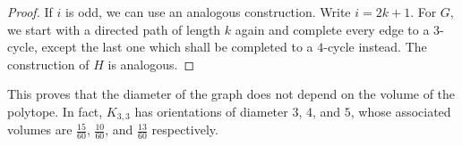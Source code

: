 \documentclass[11pt, twoside]{article}
\numberwithin{equation}{section}
\numberwithin{table}{section}
\numberwithin{figure}{section}
\theoremstyle{definition}
\theoremstyle{definition}
\theoremstyle{definition}
\begin{document}
\begin{appendices}
\begin{proof}
    If $i$ is odd, we can use an analogous construction.
    Write $i=2k+1$.
    For $G$, we start with a directed path of length $k$ again and complete every edge to a $3$-cycle, except the last one which shall be completed to a $4$-cycle instead.
    The construction of $H$ is analogous.
\end{proof}

This proves that the diameter of the graph does not depend on the volume of the polytope.
In fact, $K_{3,3}$ has orientations of diameter $3$, $4$, and $5$, whose associated volumes are $\frac{15}{60}$, $\frac{10}{60}$, and $\frac{13}{60}$ respectively.

\end{appendices}
\end{document}
